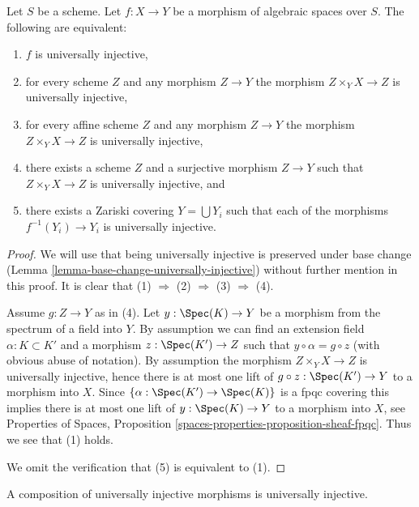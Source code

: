 \begin{lemma}
\label{lemma-universally-injective-local}
Let $S$ be a scheme.
Let $f : X \to Y$ be a morphism of algebraic spaces over $S$.
The following are equivalent:
\begin{enumerate}
\item $f$ is universally injective,
\item for every scheme $Z$ and any morphism $Z \to Y$ the morphism
$Z \times_Y X \to Z$ is universally injective,
\item for every affine scheme $Z$ and any morphism
$Z \to Y$ the morphism $Z \times_Y X \to Z$ is universally injective,
\item there exists a scheme $Z$ and a surjective morphism
$Z \to Y$ such that $Z \times_Y X \to Z$ is universally injective, and
\item there exists a Zariski covering $Y = \bigcup Y_i$ such that
each of the morphisms $f^{-1}(Y_i) \to Y_i$ is universally injective.
\end{enumerate}
\end{lemma}

\begin{proof}
We will use that being universally injective is preserved under base change
(Lemma \ref{lemma-base-change-universally-injective})
without further mention in this proof.
It is clear that (1) $\Rightarrow$ (2) $\Rightarrow$ (3)
$\Rightarrow$ (4).

\medskip\noindent
Assume $g : Z \to Y$ as in (4). Let $y : \Spec(K) \to Y$ be a
morphism from the spectrum of a field into $Y$. By assumption we
can find an extension field $\alpha : K \subset K'$ and a morphism
$z : \Spec(K') \to Z$ such that $y \circ \alpha = g \circ z$
(with obvious abuse of notation). By assumption the
morphism $Z \times_Y X \to Z$ is universally injective, hence there
is at most one
lift of $g \circ z : \Spec(K') \to Y$ to a morphism into $X$.
Since $\{\alpha : \Spec(K') \to \Spec(K)\}$ is a
fpqc covering this implies there is at most one lift of
$y : \Spec(K) \to Y$ to a morphism into $X$, see
Properties of Spaces, Proposition
\ref{spaces-properties-proposition-sheaf-fpqc}.
Thus we see that (1) holds.

\medskip\noindent
We omit the verification that (5) is equivalent to (1).
\end{proof}

\begin{lemma}
\label{lemma-composition-universally-injective}
A composition of universally injective morphisms is universally injective.
\end{lemma}

